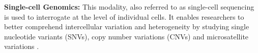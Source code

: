 \textbf{Single-cell Genomics: }This modality, also referred to as single-cell  sequencing is used to interrogate  at the level of individual cells. It enables researchers to better comprehend intercellular variation and heterogeneity by studying single nucleotide variants (SNVs), copy number variations (CNVs) and microsatellite variations \textbf{\cite{stein_single-cell_2021,luquette_identification_2019,mallory_methods_2020,woodworth_building_2017}}.\\

